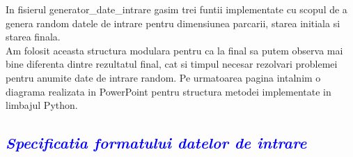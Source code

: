 \documentclass{article}
\begin{document}
\begin{flushleft}
\quad In fisierul generator\_date\_intrare gasim trei funtii implementate cu scopul de a genera random datele de intrare pentru dimensiunea parcarii, starea initiala si starea finala.  \\ 
\vspace{2mm}
Am folosit aceasta structura modulara pentru ca la final sa putem observa mai bine diferenta dintre rezultatul final, cat si timpul necesar rezolvari problemei pentru anumite date de intrare random. Pe urmatoarea pagina intalnim o diagrama realizata in PowerPoint pentru structura metodei implementate in limbajul Python.\par
\end{flushleft}
\newpage
\begin{flushleft}
    \textcolor{blue}{\subsection{\itshape \textcolor{blue}{Specificatia formatului datelor de intrare}}}
     \vspace{5mm}
\end{flushleft}
\end{document}

